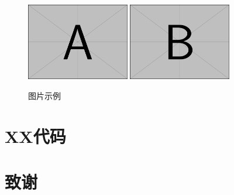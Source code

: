 \documentclass{swufethesis}
\begin{document}
\begin{figure}[htb]
  \centering
  \includegraphics[width=0.4\textwidth]{figures/example-image-a.pdf}
  \includegraphics[width=0.4\textwidth]{figures/example-image-b.pdf}
  \caption{图片示例}
\end{figure}

\printbibliography
\appendix
\chapter{XX代码}
\newpage
\chapter{致谢}
\end{document}
